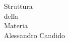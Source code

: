 \begin{multicols}{2}
\begin{figure}[H]
\end{figure}

\vfill\null
\columnbreak

\begin{flushright}
	\vspace*{100pt}
	{\fontsize{2cm}{1.5cm}\selectfont
		 Struttura \\della \\Materia}\\
	\vspace{20pt}
	{\fontsize{0.8cm}{0cm}\selectfont Alessandro Candido}\\
\end{flushright}
\vspace{30pt}
\end{multicols}